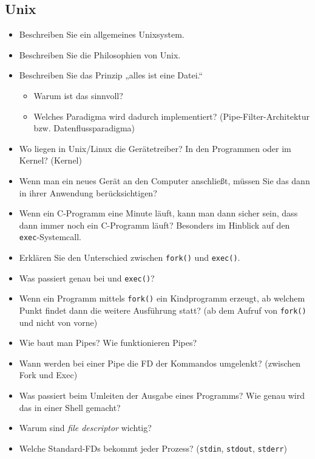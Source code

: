 \documentclass[
  a4paper,
  11pt,
]{article}
\title{}
\author{}
\begin{document}
\thispagestyle{fancy}

\subsection*{Unix}
\label{sub:Unix}

\begin{itemize}
  \item Beschreiben Sie ein allgemeines Unixsystem.
  \item Beschreiben Sie die Philosophien von Unix.
  \item Beschreiben Sie das Prinzip „alles ist eine Datei.“
    \begin{itemize}
      \item Warum ist das sinnvoll?
      \item Welches Paradigma wird dadurch implementiert?
        (Pipe-Filter-Architektur bzw. Datenflussparadigma)
    \end{itemize}
  \item Wo liegen in Unix/Linux die Gerätetreiber? In den Programmen oder im
    Kernel? (Kernel)
  \item Wenn man ein neues Gerät an den Computer anschließt, müssen Sie das dann
    in ihrer Anwendung berücksichtigen?
  \item Wenn ein C-Programm eine Minute läuft, kann man dann sicher sein, dass
    dann immer noch ein C-Programm läuft? Besonders im Hinblick auf den
    \texttt{exec}-Systemcall.
  \item Erklären Sie den Unterschied zwischen \texttt{fork()} und
    \texttt{exec()}.
  \item Was passiert genau bei  und \texttt{exec()}?
  \item Wenn ein Programm mittels \texttt{fork()} ein Kindprogramm erzeugt, ab
    welchem Punkt findet dann die weitere Ausführung statt? (ab dem Aufruf von
    \texttt{fork()} und nicht von vorne)
  \item Wie baut man Pipes? Wie funktionieren Pipes?
  \item Wann werden bei einer Pipe die FD der Kommandos umgelenkt? (zwischen Fork und Exec)
  \item Was passiert beim Umleiten der Ausgabe eines Programms? Wie genau wird
    das in einer Shell gemacht?
  \item Warum sind \textit{file descriptor} wichtig?
  \item Welche Standard-FDs bekommt jeder Prozess? (\texttt{stdin},
    \texttt{stdout}, \texttt{stderr})
\end{itemize}
\end{document}
